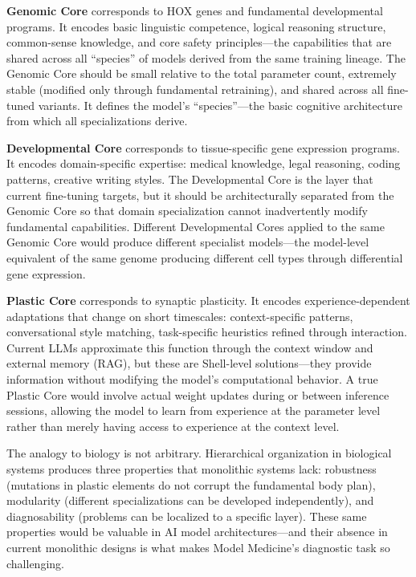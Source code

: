 \documentclass[11pt]{article}
\begin{document}
\textbf{Genomic Core} corresponds to HOX genes and fundamental developmental programs. It encodes basic linguistic competence, logical reasoning structure, common-sense knowledge, and core safety principles---the capabilities that are shared across all ``species'' of models derived from the same training lineage. The Genomic Core should be small relative to the total parameter count, extremely stable (modified only through fundamental retraining), and shared across all fine-tuned variants. It defines the model's ``species''---the basic cognitive architecture from which all specializations derive.

\textbf{Developmental Core} corresponds to tissue-specific gene expression programs. It encodes domain-specific expertise: medical knowledge, legal reasoning, coding patterns, creative writing styles. The Developmental Core is the layer that current fine-tuning targets, but it should be architecturally separated from the Genomic Core so that domain specialization cannot inadvertently modify fundamental capabilities. Different Developmental Cores applied to the same Genomic Core would produce different specialist models---the model-level equivalent of the same genome producing different cell types through differential gene expression.

\textbf{Plastic Core} corresponds to synaptic plasticity. It encodes experience-dependent adaptations that change on short timescales: context-specific patterns, conversational style matching, task-specific heuristics refined through interaction. Current LLMs approximate this function through the context window and external memory (RAG), but these are Shell-level solutions---they provide information without modifying the model's computational behavior. A true Plastic Core would involve actual weight updates during or between inference sessions, allowing the model to learn from experience at the parameter level rather than merely having access to experience at the context level.

The analogy to biology is not arbitrary. Hierarchical organization in biological systems produces three properties that monolithic systems lack: robustness (mutations in plastic elements do not corrupt the fundamental body plan), modularity (different specializations can be developed independently), and diagnosability (problems can be localized to a specific layer). These same properties would be valuable in AI model architectures---and their absence in current monolithic designs is what makes Model Medicine's diagnostic task so challenging.
\end{document}

